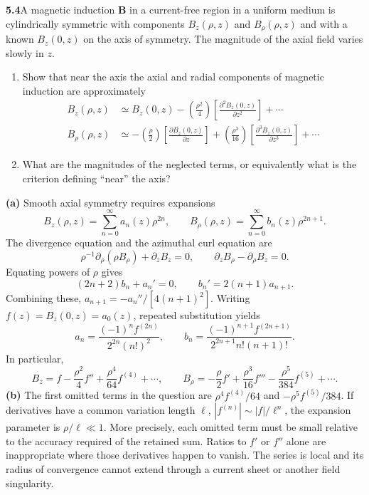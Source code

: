 \par\bigskip
\noindent\textbf{5.4}\quad A magnetic induction $\mathbf{B}$ in a current-free region in a uniform medium is cylindrically symmetric with components $B_{z}(\rho,z)$ and $B_{\rho}(\rho,z)$ and with a known $B_{z}(0,z)$ on the axis of symmetry. The magnitude of the axial field varies slowly in $z$.
\begin{enumerate}
\item[(a)] Show that near the axis the axial and radial components of magnetic induction are approximately
\begin{align*}
B_{z}(\rho,z)&\simeq B_{z}(0,z)-\left(\frac{\rho^{2}}{4}\right)\!\left[\frac{\partial^{2}B_{z}(0,z)}{\partial z^{2}}\right]+\cdots\\
B_{\rho}(\rho,z)&\simeq-\left(\frac{\rho}{2}\right)\!\left[\frac{\partial B_{z}(0,z)}{\partial z}\right]+\left(\frac{\rho^{3}}{16}\right)\!\left[\frac{\partial^{3}B_{z}(0,z)}{\partial z^{3}}\right]+\cdots
\end{align*}
\item[(b)] What are the magnitudes of the neglected terms, or equivalently what is the criterion defining ``near'' the axis?
\end{enumerate}
\solution
\textbf{(a)} Smooth axial symmetry requires expansions
\[
B_z(\rho,z)=\sum_{n=0}^\infty a_n(z)\rho^{2n},\qquad
B_\rho(\rho,z)=\sum_{n=0}^\infty b_n(z)\rho^{2n+1}.
\]
The divergence equation and the azimuthal curl equation are
\[
\rho^{-1}\partial_\rho(\rho B_\rho)+\partial_zB_z=0,\qquad
\partial_zB_\rho-\partial_\rho B_z=0.
\]
Equating powers of $\rho$ gives
\[
(2n+2)b_n+a_n'=0,\qquad b_n'=2(n+1)a_{n+1}.
\]
Combining these, $a_{n+1}=-a_n''/[4(n+1)^2]$.
Writing $f(z)=B_z(0,z)=a_0(z)$, repeated substitution yields
\[
a_n=\frac{(-1)^nf^{(2n)}}{2^{2n}(n!)^2},\qquad
b_n=\frac{(-1)^{n+1}f^{(2n+1)}}{2^{2n+1}n!(n+1)!}.
\]
In particular,
\[
\boxed{B_z=f-\frac{\rho^2}{4}f''+\frac{\rho^4}{64}f^{(4)}+\cdots,}
\qquad
\boxed{B_\rho=-\frac{\rho}{2}f'+\frac{\rho^3}{16}f'''
-\frac{\rho^5}{384}f^{(5)}+\cdots.}
\]
\textbf{(b)} The first omitted terms in the question are
$\rho^4f^{(4)}/64$ and $-\rho^5f^{(5)}/384$.
If derivatives have a common variation length $\ell$,
$|f^{(n)}|\sim |f|/\ell^n$, the expansion parameter is $\rho/\ell\ll1$.
More precisely, each omitted term must be small relative to the accuracy
required of the retained sum. Ratios to $f'$ or $f''$ alone are
inappropriate where those derivatives happen to vanish. The series is
local and its radius of convergence cannot extend through a current sheet
or another field singularity.


